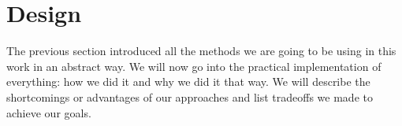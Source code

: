 \section{Design}

The previous section introduced all the methods we are going to be
using in this work in an abstract way. We will now go into the
practical implementation of everything: how we did it and why we did
it that way. We will describe the shortcomings or advantages of our
approaches and list tradeoffs we made to achieve our goals.










